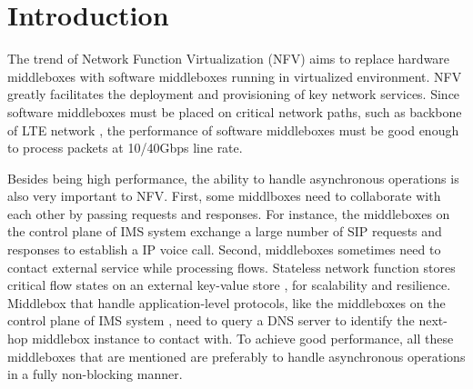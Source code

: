 \section{Introduction}


The trend of Network Function Virtualization (NFV) \cite{nfv-website} aims to replace hardware middleboxes with software middleboxes running in virtualized environment. NFV greatly facilitates the deployment and provisioning of key network services. Since software middleboxes must be placed on critical network paths, such as backbone of LTE network \cite{201569}, the performance of software middleboxes must be good enough to process packets at 10/40Gbps line rate.

Besides being high performance, the ability to handle asynchronous operations is also very important to NFV. First, some middlboxes need to collaborate with each other by passing requests and responses. For instance, the middleboxes on the control plane of IMS system \cite{3gpp-ims} exchange a large number of SIP \cite{sip} requests and responses to establish a IP voice call. Second, middleboxes sometimes need to contact external service while processing flows. Stateless network function \cite{201545} stores critical flow states on an external key-value store \cite{ousterhout2015ramcloud}, for scalability and resilience. Middlebox that handle application-level protocols, like the middleboxes on the control plane of IMS system \cite{}, need to query a DNS server to identify the next-hop middlebox instance to contact with. To achieve good performance, all these middleboxes that are mentioned are preferably to handle asynchronous operations in a fully non-blocking manner.


